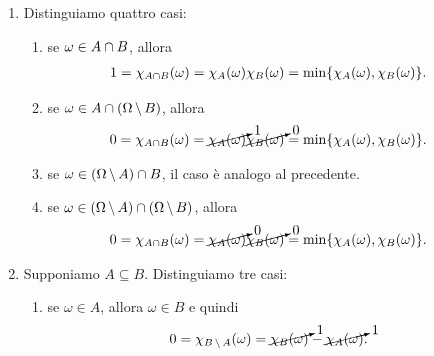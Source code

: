 \documentclass[a4paper]{article}
\begin{document}
\begin{snippetproof}{}
\begin{enumerate}
\begin{enumerate}
\begin{align*}
                        0 &= \chi_{A \union B}(\omega) = \max\{\chi_A(\omega), \chi_B(\omega)\} \\
                        &= \cancelto{0}{\chi_A(\omega)} + \cancelto{0}{\chi_B(\omega)} - \cancelto{0}{\chi_{A \intersection B}(\omega)}
                    \end{align*}
            \end{enumerate}
        \item Distinguiamo quattro casi:
            \begin{enumerate}
                \item se \(\omega \in A \cap B\), allora
                    \begin{align*}
                        1 &= \chi_{A \cap B}(\omega)
                        = \chi_A(\omega)\chi_B(\omega)
                        = \min\{\chi_A(\omega), \chi_B(\omega)\}.
                    \end{align*}
                \item se \(\omega \in A \cap (\Omega \,\backslash\, B)\), allora
                    \begin{align*}
                        0 &= \chi_{A \cap B}(\omega)
                        = \cancelto{1}{\chi_A(\omega)}
                        \cancelto{0}{\chi_B(\omega)}
                        = \min\{\chi_A(\omega), \chi_B(\omega)\}.
                    \end{align*}
                \item se \(\omega \in (\Omega \,\backslash\, A) \cap B\), il caso è analogo al precedente.
                \item se \(\omega \in (\Omega \,\backslash\, A) \cap (\Omega \,\backslash\, B)\), allora
                    \begin{align*}
                        0 &= \chi_{A \cap B}(\omega)
                        = \cancelto{0}{\chi_A(\omega)}
                        \cancelto{0}{\chi_B(\omega)}
                        = \min\{\chi_A(\omega), \chi_B(\omega)\}.
                    \end{align*}
            \end{enumerate}
        \item Supponiamo \(A \subseteq B\).
            Distinguiamo tre casi:
            \begin{enumerate}
                \item se \(\omega \in A\), allora \(\omega \in B\) e quindi
                    \begin{align*}
                        0 &= \chi_{B \,\backslash\, A}(\omega)
                        = \cancelto{1}{\chi_B(\omega)}
                        - \cancelto{1}{\chi_A(\omega)}.
                    \end{align*}


\end{enumerate}
\end{enumerate}
\end{snippetproof}
\end{document}
